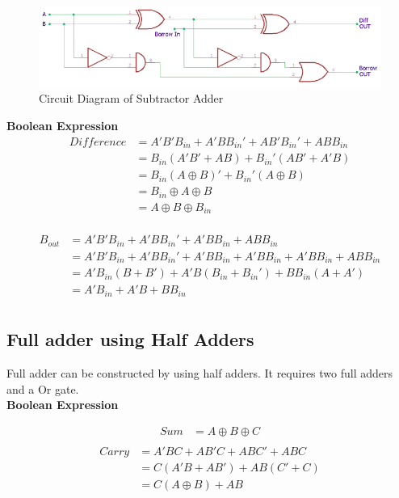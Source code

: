 \documentclass[a4paper, 12pt]{article}
\begin{document}
\begin{figure}[h]
	\centering
	\includegraphics[scale=0.6]{full-sub-circuit.png}
	\caption{Circuit Diagram of Subtractor Adder}
\end{figure}

\textbf{Boolean Expression}
\begin{equation}
\begin{split}
	Difference&= A'B'B_{in} + A'BB_{in}' + AB'B_{in}' + ABB_{in} \\
						&= B_{in}(A'B' + AB) + B_{in}'(AB' + A'B) \\
						&= B_{in}(A \oplus B)' + B_{in}'(A \oplus B) \\
						&= B_{in} \oplus A \oplus B \\
						&= A \oplus B \oplus B_{in} \\
\end{split}
\end{equation}

\begin{equation}
\begin{split}
	B_{out} & = A'B'B_{in} + A'BB_{in}' + A'BB_{in} + ABB_{in} \\
	 				& = A'B'B_{in} + A'BB_{in}' + A'BB_{in} + A'BB_{in} + A'BB_{in} + ABB_{in} \\
					& = A'B_{in} (B + B') + A'B (B_{in} + B_{in}') + BB_{in}(A + A') \\
					& = A'B_{in} + A'B + BB_{in} \\
\end{split}
\end{equation}
\pagebreak

\subsection{Full adder using Half Adders}
Full adder can be constructed by using half adders. It requires two full adders and a Or gate. \\
\textbf{Boolean Expression}

\begin{equation}
\begin{split}
	Sum &= A\oplus B \oplus C \\
\end{split}
\end{equation}
\begin{equation}
\begin{split}
	Carry &= A'BC + AB'C + ABC' + ABC \\
				&= C(A'B + AB') + AB(C' + C) \\
				&= C(A\oplus B) + AB \\
\end{split}
\end{equation}
\end{document}
